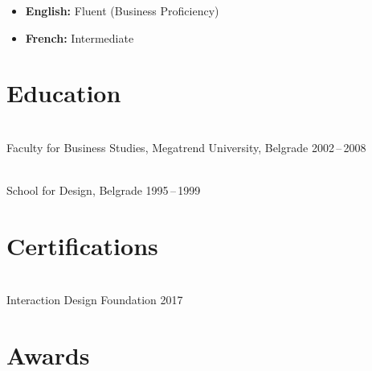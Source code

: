 \documentclass[a4paper,9.5pt]{article}
\begin{document}
\begin{itemize}[leftmargin=1.2em, label={•},
    topsep=0pt, itemsep=2pt, parsep=0pt]
  \item {\small\textbf{English:} Fluent (Business Proficiency)}
  \item {\small\textbf{French:} Intermediate}
\end{itemize}

\section{Education}

\\[1pt]
{\small\color{midgray}Faculty for Business Studies,
Megatrend University, Belgrade \hfill 2002\,--\,2008}

\vspace{6pt}

\\[1pt]
{\small\color{midgray}School for Design, Belgrade
\hfill 1995\,--\,1999}

\section{Certifications}

\\[1pt]
{\small\color{midgray}Interaction Design Foundation
\hfill 2017}

\section{Awards}

\end{document}
